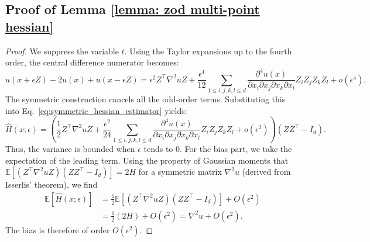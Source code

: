 \documentclass[twoside,11pt]{article}
\newcommand{\E}{\mathbb{E}}
\newcommand{\1}{\mathbf{1}}
\numberwithin{equation}{section}
\begin{document}
\subsection{Proof of Lemma \ref{lemma: zod multi-point hessian}}
\begin{proof}
We suppress the variable $t$. Using the Taylor expansions up to the fourth order, the central difference numerator becomes:
\[ u(x+\epsilon Z) - 2u(x) + u(x-\epsilon Z) = \epsilon^2 Z^\top \nabla^2u Z + \frac{\epsilon^4}{12} \sum_{1\le i,j,k,l\le d}\frac{\partial^4 u(x)}{\partial x_i \partial x_j \partial x_k \partial x_l}Z_iZ_jZ_kZ_l + o(\epsilon^4). \]
 The symmetric construction cancels all the odd-order terms. Substituting this into Eq.~\eqref{eq:symmetric_hessian_estimator} yields:
\begin{equation}\label{eq: 3-point hessian}
\hat{H}(x; \epsilon) = \left( \frac{1}{2} Z^\top \nabla^2u Z + \frac{\epsilon^2}{24} \sum_{1\le i,j,k,l\le d}\frac{\partial^4 u(x)}{\partial x_i \partial x_j \partial x_k \partial x_l}Z_iZ_jZ_kZ_l + o(\epsilon^2) \right) (ZZ^\top - I_d). \end{equation}
Thus, the variance is bounded when $\epsilon$ tends  to $0$. For the bias part, we take the expectation of the leading term. Using the property of Gaussian moments that $\E[(Z^\top \nabla^2u Z)(ZZ^\top - I_d)] = 2H$ for a symmetric matrix $\nabla^2u$ (derived from Isserlis' theorem), we find
\begin{align*}
    \E[\hat{H}(x; \epsilon)] &= \frac{1}{2} \E\left[ (Z^\top \nabla^2u Z) (ZZ^\top - I_d) \right] + O(\epsilon^2) \\
    &= \frac{1}{2} (2H) + O(\epsilon^2) = \nabla^2u + O(\epsilon^2).
\end{align*}
The bias is therefore of order $O(\epsilon^2)$.
\end{proof}
\end{document}
